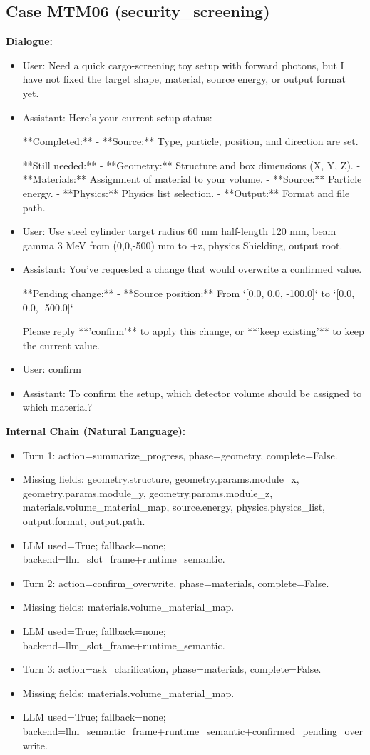 \documentclass[11pt]{ctexart}
\begin{document}
\subsection{Case MTM06 (security\_screening)}
\textbf{Dialogue:}
\begin{itemize}
\item User: Need a quick cargo-screening toy setup with forward photons, but I have not fixed the target shape, material, source energy, or output format yet.
\item Assistant: Here's your current setup status:

**Completed:**
- **Source:** Type, particle, position, and direction are set.

**Still needed:**
- **Geometry:** Structure and box dimensions (X, Y, Z).
- **Materials:** Assignment of material to your volume.
- **Source:** Particle energy.
- **Physics:** Physics list selection.
- **Output:** Format and file path.
\item User: Use steel cylinder target radius 60 mm half-length 120 mm, beam gamma 3 MeV from (0,0,-500) mm to +z, physics Shielding, output root.
\item Assistant: You've requested a change that would overwrite a confirmed value.

**Pending change:**
- **Source position:** From `[0.0, 0.0, -100.0]` to `[0.0, 0.0, -500.0]`

Please reply **'confirm'** to apply this change, or **'keep existing'** to keep the current value.
\item User: confirm
\item Assistant: To confirm the setup, which detector volume should be assigned to which material?
\end{itemize}
\textbf{Internal Chain (Natural Language):}
\begin{itemize}
\item Turn 1: action=summarize\_progress, phase=geometry, complete=False.
\item Missing fields: geometry.structure, geometry.params.module\_x, geometry.params.module\_y, geometry.params.module\_z, materials.volume\_material\_map, source.energy, physics.physics\_list, output.format, output.path.
\item LLM used=True; fallback=none; backend=llm\_slot\_frame+runtime\_semantic.
\item Turn 2: action=confirm\_overwrite, phase=materials, complete=False.
\item Missing fields: materials.volume\_material\_map.
\item LLM used=True; fallback=none; backend=llm\_slot\_frame+runtime\_semantic.
\item Turn 3: action=ask\_clarification, phase=materials, complete=False.
\item Missing fields: materials.volume\_material\_map.
\item LLM used=True; fallback=none; backend=llm\_semantic\_frame+runtime\_semantic+confirmed\_pending\_overwrite.
\end{itemize}
\end{document}

